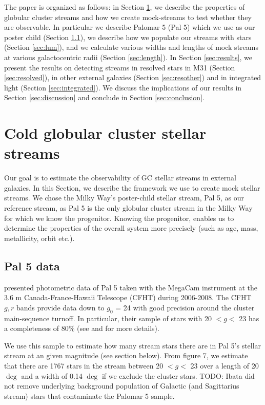 \documentclass[twocolumn]{aastex62}
\newcommand{\todo}[1]{{\color{red} TODO: #1}}
\begin{document}
The paper is organized as follows: in Section \ref{sec:coldstreams}, we describe the properties of globular cluster streams and how we create mock-streams to test whether they are observable. In particular we describe Palomar 5 (Pal 5) which we use as our poster child (Section \ref{sec:pal5}), we describe how we populate our streams with stars (Section \ref{sec:lum}), and we calculate various widths and lengths of mock streams at various galactocentric radii (Section \ref{sec:length}). In Section \ref{sec:results}, we present the results on detecting streams in resolved stars in M31 (Section \ref{sec:resolved}), in other external galaxies (Section \ref{sec:resother}) and in integrated light (Section \ref{sec:integrated}). We discuss the implications of our results in Section \ref{sec:discussion} and conclude in Section \ref{sec:conclusion}.
%

\section{Cold globular cluster stellar streams}
\label{sec:coldstreams}
Our goal is to estimate the observability of GC stellar streams in external galaxies. In this Section, we describe the framework we use to create mock stellar streams.  We chose the Milky Way's poster-child stellar stream, Pal 5,  as our reference stream, as Pal 5 is the only globular cluster stream in the Milky Way for which we know the progenitor. Knowing the progenitor, enables us to determine the properties of the overall system more precisely (such as age, mass, metallicity, orbit etc.). 

\subsection{Pal 5 data}
\label{sec:pal5}
 \citet{ibata16} presented photometric data of Pal 5 taken with the MegaCam instrument at the 3.6 m Canada-France-Hawaii Telescope (CFHT) during 2006-2008. The CFHT $g, r$ bands provide data down to $g_0$ = 24 with good precision around the cluster main-sequence turnoff. In particular, their sample of stars with 20 $< g <$ 23 has a completeness of 80\% (see \citealt{ibata16} and \citealt{ibata17} for more details). 
 
We use this sample to estimate how many stream stars there are in Pal 5's stellar stream at an given magnitude (see section below). From \citet{ibata16} figure 7, we estimate that there are 1767 stars in the stream between 20 $< g <$ 23 over a length of 20 $\deg$  and a width of 0.14 $\deg$ if we exclude the cluster stars. \todo{Ibata did not remove underlying background population of Galactic (and Sagittarius stream) stars that contaminate the Palomar 5 sample.}  
\end{document}
